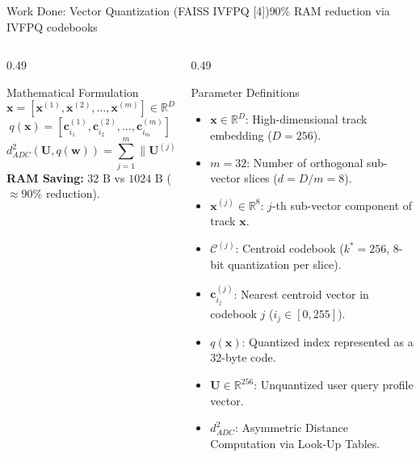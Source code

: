 \documentclass[aspectratio=169,10pt]{beamer}
\begin{document}
\begin{frame}{Work Done: Vector Quantization (FAISS IVFPQ [4])}{90\% RAM reduction via IVFPQ codebooks}
    \begin{columns}[T]
        \begin{column}{0.49\textwidth}
            \begin{block}{Mathematical Formulation}
                \fontsize{6.8pt}{8.8pt}\selectfont
                $$\mathbf{x} = [\mathbf{x}^{(1)}, \mathbf{x}^{(2)}, \dots, \mathbf{x}^{(m)}] \in \mathbb{R}^D$$
                $$q(\mathbf{x}) = [\mathbf{c}_{i_1}^{(1)}, \mathbf{c}_{i_2}^{(2)}, \dots, \mathbf{c}_{i_m}^{(m)}]$$
                $$d_{ADC}^2(\mathbf{U}, q(\mathbf{w})) = \sum_{j=1}^m \|\mathbf{U}^{(j)} - \mathbf{c}_{i_j}^{(j)}\|_2^2$$
                \textbf{RAM Saving:} $32\text{ B}$ vs $1024\text{ B}$ ($\approx 90\%$ reduction).
            \end{block}
        \end{column}

        \begin{column}{0.49\textwidth}
            \begin{block}{Parameter Definitions}
                \fontsize{6pt}{7.5pt}\selectfont
                \begin{itemize}
                    \item $\mathbf{x} \in \mathbb{R}^D$: High-dimensional track embedding ($D=256$).
                    \item $m = 32$: Number of orthogonal sub-vector slices ($d=D/m=8$).
                    \item $\mathbf{x}^{(j)} \in \mathbb{R}^8$: $j$-th sub-vector component of track $\mathbf{x}$.
                    \item $\mathcal{C}^{(j)}$: Centroid codebook ($k^*=256$, 8-bit quantization per slice).
                    \item $\mathbf{c}_{i_j}^{(j)}$: Nearest centroid vector in codebook $j$ ($i_j \in [0, 255]$).
                    \item $q(\mathbf{x})$: Quantized index represented as a 32-byte code.
                    \item $\mathbf{U} \in \mathbb{R}^{256}$: Unquantized user query profile vector.
                    \item $d_{ADC}^2$: Asymmetric Distance Computation via Look-Up Tables.
                \end{itemize}
            \end{block}
        \end{column}
    \end{columns}
\end{frame}
\end{document}
